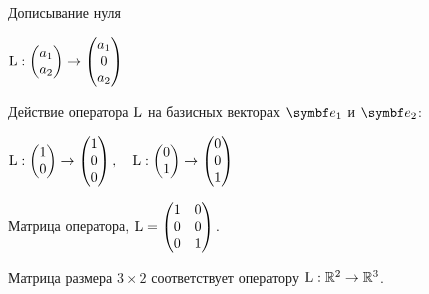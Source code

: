 \begin{frame}{Дописывание нуля}


$\operatorname{L} : \begin{pmatrix}
  a_1 \\
  a_2 \\
\end{pmatrix} \to 
\begin{pmatrix}
  a_1 \\
  0 \\
  a_2 \\
\end{pmatrix}$

\pause

Действие оператора $\operatorname{L}$ на базисных векторах $\be_1$ и $\be_2$:

$\operatorname{L} : \begin{pmatrix}
  1 \\
  0 \\
\end{pmatrix} \to 
\begin{pmatrix}
1  \\
0 \\
0  \\
\end{pmatrix}, \quad
\operatorname{L} : \begin{pmatrix}
  0 \\
  1 \\
\end{pmatrix} \to 
\begin{pmatrix}
0 \\
0 \\
1 \\
\end{pmatrix}$

\pause

Матрица оператора, $\operatorname{L} = 
\begin{pmatrix}
  1 & 0  \\
  0 & 0 \\
  0 & 1 \\
\end{pmatrix}.$


Матрица размера $3\times 2$ соответствует оператору $\operatorname{L}: \mathbb{R}^2 \to \mathbb{R}^3$.


\end{frame}
    



